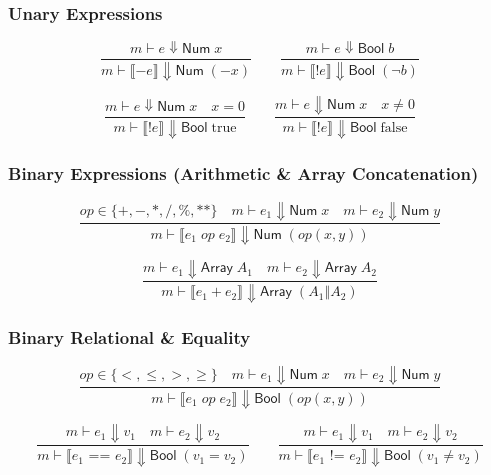 \documentclass[11pt,a4paper]{article}
\begin{document}
\subsubsection*{Unary Expressions}
\begin{equation*}
\frac{m \vdash e \Downarrow \mathsf{Num}\;x}{m \vdash \llbracket -e \rrbracket \Downarrow \mathsf{Num}\;(-x)}
\qquad
\frac{m \vdash e \Downarrow \mathsf{Bool}\;b}{m \vdash \llbracket !e \rrbracket \Downarrow \mathsf{Bool}\;(\neg b)}
\end{equation*}

\begin{equation*}
\frac{m \vdash e \Downarrow \mathsf{Num}\;x \quad x = 0}{m \vdash \llbracket !e \rrbracket \Downarrow \mathsf{Bool}\;\text{true}}
\qquad
\frac{m \vdash e \Downarrow \mathsf{Num}\;x \quad x \neq 0}{m \vdash \llbracket !e \rrbracket \Downarrow \mathsf{Bool}\;\text{false}}
\end{equation*}

\subsubsection*{Binary Expressions (Arithmetic \& Array Concatenation)}
\begin{equation*}
\frac{op \in \{+, -, *, /, \%, \text{**}\} \quad m \vdash e_1 \Downarrow \mathsf{Num}\;x \quad m \vdash e_2 \Downarrow \mathsf{Num}\;y}{m \vdash \llbracket e_1\;op\;e_2 \rrbracket \Downarrow \mathsf{Num}\;(op(x,y))}
\end{equation*}

\begin{equation*}
\frac{m \vdash e_1 \Downarrow \mathsf{Array}\;A_1 \quad m \vdash e_2 \Downarrow \mathsf{Array}\;A_2}{m \vdash \llbracket e_1 + e_2 \rrbracket \Downarrow \mathsf{Array}\;(A_1 \mathbin{\Vert} A_2)}
\end{equation*}

\subsubsection*{Binary Relational \& Equality}
\begin{equation*}
\frac{op \in \{<, \le, >, \ge\} \quad m \vdash e_1 \Downarrow \mathsf{Num}\;x \quad m \vdash e_2 \Downarrow \mathsf{Num}\;y}{m \vdash \llbracket e_1\;op\;e_2 \rrbracket \Downarrow \mathsf{Bool}\;(op(x,y))}
\end{equation*}

\begin{equation*}
\frac{m \vdash e_1 \Downarrow v_1 \quad m \vdash e_2 \Downarrow v_2}{m \vdash \llbracket e_1 \text{ == } e_2 \rrbracket \Downarrow \mathsf{Bool}\;(v_1 = v_2)}
\qquad
\frac{m \vdash e_1 \Downarrow v_1 \quad m \vdash e_2 \Downarrow v_2}{m \vdash \llbracket e_1 \text{ != } e_2 \rrbracket \Downarrow \mathsf{Bool}\;(v_1 \neq v_2)}
\end{equation*}
\end{document}
